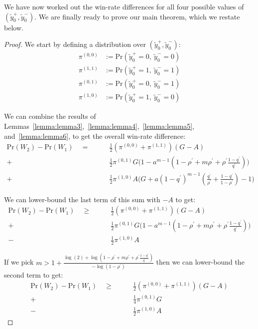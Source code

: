 We have now worked out the win-rate differences for all four possible values of $(\tilde{y}_0^{+}, \tilde{y}_0^{-})$. We are finally ready to prove our main theorem, which we restate below.\\


\begin{proof}
We start by defining a distribution over $(\tilde{y}_0^{+}, \tilde{y}_0^{-})$:
\begin{align}
\pi^{(0,0)} &:= \textrm{Pr}(\tilde{y}_0^{+} = 0,\ \tilde{y}_0^{-} = 0)\\
\pi^{(1,1)} &:= \textrm{Pr}(\tilde{y}_0^{+} = 1,\ \tilde{y}_0^{-} = 1)\\
\pi^{(0,1)} &:= \textrm{Pr}(\tilde{y}_0^{+} = 0,\ \tilde{y}_0^{-} = 1)\\
\pi^{(1,0)} &:= \textrm{Pr}(\tilde{y}_0^{+} = 1,\ \tilde{y}_0^{-} = 0)
\end{align}

We can combine the results of Lemmas~\ref{lemma:lemma3},~\ref{lemma:lemma4},~\ref{lemma:lemma5}, and~\ref{lemma:lemma6}, to get the overall win-rate difference:
\begin{align}
\label{supeq:theorem1_exact_difference}
\textrm{Pr}(W_2) - \textrm{Pr}(W_1)\quad = \qquad &\frac{1}{2} (\pi^{(0,0)} + \pi^{(1,1)}) (G - A)\\
+ &\frac{1}{2} \pi^{(0,1)}  G \Big(1 - a^{m-1}(1 - \rho^{\prime}  + m \rho^{\prime} +  \rho^{\prime} \frac{1 - q^{\prime}}{q^{\prime}})  \Big)\\
+ &\frac{1}{2} \pi^{(1,0)} A \Big(G + a (1 - q^{\prime})^{m-1} (\frac{q^{\prime}}{\rho^{\prime}} + \frac{1 - q^{\prime}}{1 - \rho^{\prime}}) - 1 \Big)
\end{align}

We can lower-bound the last term of this sum with $-A$ to get:
\begin{align}
\textrm{Pr}(W_2) - \textrm{Pr}(W_1)\quad \geq \qquad &\frac{1}{2} (\pi^{(0,0)} + \pi^{(1,1)}) (G - A)\\
+ &\frac{1}{2} \pi^{(0,1)}  G \Big(1 - a^{m-1}(1 - \rho^{\prime}  + m \rho^{\prime} +  \rho^{\prime} \frac{1 - q^{\prime}}{q^{\prime}})  \Big)\\
- &\frac{1}{2} \pi^{(1,0)} A
\end{align}

If we pick $m > 1 + \frac{\log(2) + \log(1 - \rho^{\prime}  + m \rho^{\prime} +  \rho^{\prime} \frac{1 - q^{\prime}}{q^{\prime}})}{-\log(1 - \rho^{\prime})}$ then we can lower-bound the second term to get:
\begin{align}
\textrm{Pr}(W_2) - \textrm{Pr}(W_1)\quad \geq \qquad &\frac{1}{2} (\pi^{(0,0)} + \pi^{(1,1)}) (G - A)\\
+ &\frac{1}{4} \pi^{(0,1)}  G\\
- &\frac{1}{2} \pi^{(1,0)} A
\end{align}


\end{proof}
